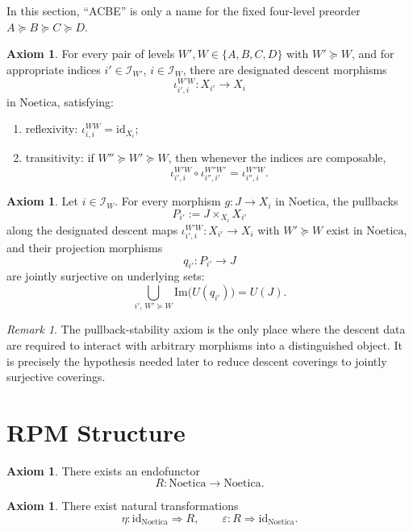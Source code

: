 \documentclass[11pt]{amsart}
\numberwithin{equation}{section}
\theoremstyle{definition}
\newtheorem{axiom}[theorem]{Axiom}
\theoremstyle{remark}
\newtheorem{remark}[theorem]{Remark}
\newcommand{\Noetica}{\mathrm{Noetica}}
\newcommand{\id}{\mathrm{id}}
\newcommand{\I}{\mathcal{I}}
\begin{document}
In this section, ``ACBE'' is only a name for the fixed four-level preorder \(A \succeq B \succeq C \succeq D\).

\begin{axiom}
For every pair of levels \(W',W \in \{A,B,C,D\}\) with \(W' \succeq W\), and for appropriate indices \(i' \in \I_{W'}\), \(i \in \I_W\), there are designated descent morphisms
\[
\iota^{W'W}_{i',i} : X_{i'} \to X_i
\]
in \(\Noetica\), satisfying:
\begin{enumerate}[label=(\roman*)]
\item reflexivity: \(\iota^{WW}_{i,i} = \id_{X_i}\);
\item transitivity: if \(W'' \succeq W' \succeq W\), then whenever the indices are composable,
\[
\iota^{W'W}_{i',i} \circ \iota^{W''W'}_{i'',i'} = \iota^{W''W}_{i'',i}.
\]
\end{enumerate}
\end{axiom}

\begin{axiom}
Let \(i \in \I_W\). For every morphism \(g : J \to X_i\) in \(\Noetica\), the pullbacks
\[
P_{i'} := J \times_{X_i} X_{i'}
\]
along the designated descent maps \(\iota^{W'W}_{i',i} : X_{i'} \to X_i\) with \(W' \succeq W\) exist in \(\Noetica\), and their projection morphisms
\[
q_{i'} : P_{i'} \to J
\]
are jointly surjective on underlying sets:
\[
\bigcup_{i',\,W' \succeq W} \mathrm{Im}\bigl(U(q_{i'})\bigr) = U(J).
\]
\end{axiom}

\begin{remark}
The pullback-stability axiom is the only place where the descent data are required to interact with arbitrary morphisms into a distinguished object. It is precisely the hypothesis needed later to reduce descent coverings to jointly surjective coverings.
\end{remark}

\section{RPM Structure}

\begin{axiom}
There exists an endofunctor
\[
R : \Noetica \to \Noetica.
\]
\end{axiom}

\begin{axiom}
There exist natural transformations
\[
\eta : \id_{\Noetica} \Rightarrow R,
\qquad
\varepsilon : R \Rightarrow \id_{\Noetica}.
\]
\end{axiom}
\end{document}
